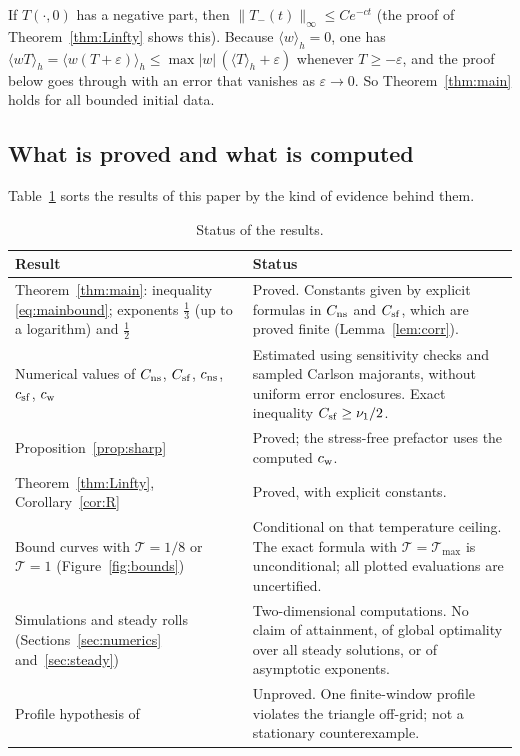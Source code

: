 \begin{remark}
If $T(\cdot,0)$ has a negative part, then $\|T_-(t)\|_\infty\le Ce^{-ct}$ (the proof of
Theorem~\ref{thm:Linfty} shows this). Because $\langle w\rangle_h=0$, one has
$\langle wT\rangle_h=\langle w(T+\varepsilon)\rangle_h\le \max|w|\,(\langle T\rangle_h+\varepsilon)$ whenever
$T\ge-\varepsilon$, and the proof below goes through with an error that vanishes as $\varepsilon\to0$. So
Theorem~\ref{thm:main} holds for all bounded initial data.
\end{remark}

\subsection{What is proved and what is computed}\label{sec:status}
Table~\ref{tab:status} sorts the results of this paper by the kind of evidence behind them.

\begin{table}[h]\centering\small
\caption{Status of the results.}\label{tab:status}
\begin{tabular}{p{}p{}}\hline
Result & Status\\\hline
Theorem~\ref{thm:main}: inequality \eqref{eq:mainbound}; exponents $\frac13$ (up to a logarithm) and $\frac12$ &
Proved. Constants given by explicit formulas in $C_{\rm ns}$ and $C_{\rm sf}$, which are proved finite
(Lemma~\ref{lem:corr}).\\
Numerical values of $C_{\rm ns}$, $C_{\rm sf}$, $c_{\rm ns}$, $c_{\rm sf}$, $c_{\rm w}$ &
Estimated using sensitivity checks and sampled Carlson majorants, without uniform error enclosures. Exact inequality $C_{\rm sf}\ge\nu_1/2$.\\
Proposition~\ref{prop:sharp} & Proved; the stress-free prefactor uses the computed $c_{\rm w}$.\\
Theorem~\ref{thm:Linfty}, Corollary~\ref{cor:R} & Proved, with explicit constants.\\
Bound curves with $\mathcal T=1/8$ or $\mathcal T=1$ (Figure~\ref{fig:bounds}) &
Conditional on that temperature ceiling. The exact formula with $\mathcal T=\mathcal T_{\max}$ is unconditional; all plotted evaluations are uncertified.\\
Simulations and steady rolls (Sections~\ref{sec:numerics} and~\ref{sec:steady}) & Two-dimensional
computations. No claim of attainment, of global optimality over all steady solutions, or of asymptotic
exponents.\\
Profile hypothesis of \citet{ChenEtAl2024} & Unproved. One finite-window profile violates the triangle off-grid; not a stationary counterexample.\\
\hline\end{tabular}\end{table}

